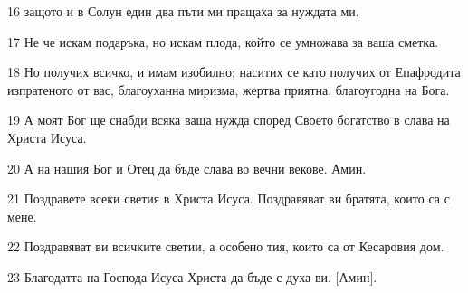\par 16 защото и в Солун един два пъти ми пращаха за нуждата ми.
\par 17 Не че искам подаръка, но искам плода, който се умножава за ваша сметка.
\par 18 Но получих всичко, и имам изобилно; наситих се като получих от Епафродита изпратеното от вас, благоуханна миризма, жертва приятна, благоугодна на Бога.
\par 19 А моят Бог ще снабди всяка ваша нужда според Своето богатство в слава на Христа Исуса.
\par 20 А на нашия Бог и Отец да бъде слава во вечни векове. Амин.
\par 21 Поздравете всеки светия в Христа Исуса. Поздравяват ви братята, които са с мене.
\par 22 Поздравяват ви всичките светии, а особено тия, които са от Кесаровия дом.
\par 23 Благодатта на Господа Исуса Христа да бъде с духа ви. [Амин].


